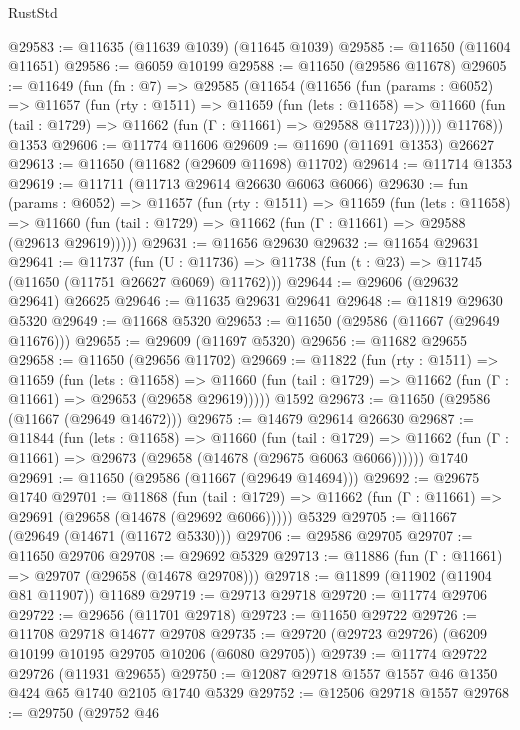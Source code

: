 \begin{lexlean}{RustStd}
\begin{coremodule}
@29583 := @11635 (@11639 @1039) (@11645 @1039)
@29585 := @11650 (@11604 @11651)
@29586 := @6059 @10199
@29588 := @11650 (@29586 @11678)
@29605 := @11649
    (fun (fn : @7) =>
    @29585
      (@11654
        (@11656
          (fun (params : @6052) =>
          @11657
            (fun (rty : @1511) =>
            @11659
              (fun (lets : @11658) =>
              @11660 (fun (tail : @1729) => @11662 (fun (Γ : @11661) => @29588 @11723))))))
        @11768))
    @1353
@29606 := @11774 @11606
@29609 := @11690 (@11691 @1353) @26627
@29613 := @11650 (@11682 (@29609 @11698) @11702)
@29614 := @11714 @1353
@29619 := @11711 (@11713 @29614 @26630 @6063 @6066)
@29630 := fun (params : @6052) =>
  @11657
    (fun (rty : @1511) =>
    @11659
      (fun (lets : @11658) =>
      @11660 (fun (tail : @1729) => @11662 (fun (Γ : @11661) => @29588 (@29613 @29619)))))
@29631 := @11656 @29630
@29632 := @11654 @29631
@29641 := @11737
    (fun (U : @11736) => @11738 (fun (t : @23) => @11745 (@11650 (@11751 @26627 @6069) @11762)))
@29644 := @29606 (@29632 @29641) @26625
@29646 := @11635 @29631 @29641
@29648 := @11819 @29630 @5320
@29649 := @11668 @5320
@29653 := @11650 (@29586 (@11667 (@29649 @11676)))
@29655 := @29609 (@11697 @5320)
@29656 := @11682 @29655
@29658 := @11650 (@29656 @11702)
@29669 := @11822
    (fun (rty : @1511) =>
    @11659
      (fun (lets : @11658) =>
      @11660 (fun (tail : @1729) => @11662 (fun (Γ : @11661) => @29653 (@29658 @29619)))))
    @1592
@29673 := @11650 (@29586 (@11667 (@29649 @14672)))
@29675 := @14679 @29614 @26630
@29687 := @11844
    (fun (lets : @11658) =>
    @11660
      (fun (tail : @1729) =>
      @11662 (fun (Γ : @11661) => @29673 (@29658 (@14678 (@29675 @6063 @6066))))))
    @1740
@29691 := @11650 (@29586 (@11667 (@29649 @14694)))
@29692 := @29675 @1740
@29701 := @11868
    (fun (tail : @1729) => @11662 (fun (Γ : @11661) => @29691 (@29658 (@14678 (@29692 @6066)))))
    @5329
@29705 := @11667 (@29649 (@14671 (@11672 @5330)))
@29706 := @29586 @29705
@29707 := @11650 @29706
@29708 := @29692 @5329
@29713 := @11886 (fun (Γ : @11661) => @29707 (@29658 (@14678 @29708)))
@29718 := @11899 (@11902 (@11904 @81 @11907)) @11689
@29719 := @29713 @29718
@29720 := @11774 @29706
@29722 := @29656 (@11701 @29718)
@29723 := @11650 @29722
@29726 := @11708 @29718 @14677 @29708
@29735 := @29720 (@29723 @29726) (@6209 @10199 @10195 @29705 @10206 (@6080 @29705))
@29739 := @11774 @29722 @29726 (@11931 @29655)
@29750 := @12087 @29718 @1557 @1557 @46 @1350 @424 @65 @1740 @2105 @1740 @5329
@29752 := @12506 @29718 @1557
@29768 := @29750
    (@29752
      @46

\end{coremodule}
\end{lexlean}
